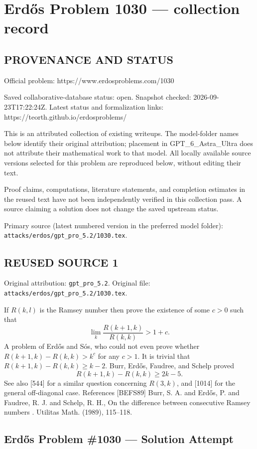 \section*{Erd\H{o}s Problem 1030 --- collection record}

\subsection*{PROVENANCE AND STATUS}
Official problem: https://www.erdosproblems.com/1030

Saved collaborative-database status: open.
Snapshot checked: 2026-09-23T17:22:24Z.
Latest status and formalization links: https://teorth.github.io/erdosproblems/

This is an attributed collection of existing writeups. The model-folder names below identify their original attribution; placement in GPT\_6\_Astra\_Ultra does not attribute their mathematical work to that model. All locally available source versions selected for this problem are reproduced below, without editing their text.

Proof claims, computations, literature statements, and completion estimates in the reused text have not been independently verified in this collection pass. A source claiming a solution does not change the saved upstream status.

Primary source (latest numbered version in the preferred model folder): \texttt{attacks/erdos/gpt\_pro\_5.2/1030.tex}.

\subsection*{REUSED SOURCE 1}
Original attribution: \texttt{gpt\_pro\_5.2}.
Original file: \texttt{attacks/erdos/gpt\_pro\_5.2/1030.tex}.


If $R(k,l)$ is the Ramsey number then prove the existence of some $c>0$ such that\[\lim_k \frac{R(k+1,k)}{R(k,k)}> 1+c.\] A problem of Erd\H{o}s and S\'{o}s, who could not even prove whether $R(k+1,k)-R(k,k)>k^c$ for any $c>1$. It is trivial that $R(k+1,k)-R(k,k)\geq k-2$. Burr, Erd\H{o}s, Faudree, and Schelp \cite{BEFS89} proved\[R(k+1,k)-R(k,k)\geq 2k-5.\]See also [544] for a similar question concerning $R(3,k)$, and [1014] for the general off-diagonal case. References [BEFS89] Burr, S. A. and Erd\H{o}s, P. and Faudree, R. J. and Schelp, R. H., On the difference between consecutive {R}amsey numbers . Utilitas Math. (1989), 115--118.

\subsection*{Erd\H{o}s Problem \#1030 --- Solution Attempt}

